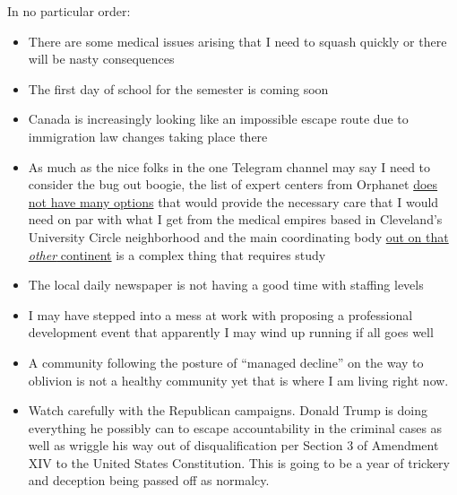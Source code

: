 In no particular order:

\begin{itemize}
\tightlist
\item
  There are some medical issues arising that I need to squash quickly or
  there will be nasty consequences
\item
  The first day of school for the semester is coming soon
\item
  Canada is increasingly looking like an impossible escape route due to
  immigration law changes taking place there
\item
  As much as the nice folks in the one Telegram channel may say I need
  to consider the bug out boogie, the list of expert centers from
  Orphanet
  \href{https://www.orpha.net/consor/cgi-bin/Clinics_Search.php?Clinics_Clinics_Search_ActivitiesList_Sort=null&lng=EN&type_list=clinics_search_simple_shd&data_id=21218&Disease\%28s\%29\%2Fgroup_of_diseases=PTEN-hamartoma-tumor-syndrome&title=PTEN+hamartoma+tumor+syndrome&search=Clinics_Search_Simple&ChdId=21218&Clinics_Clinics_Search_diseaseGroup=PTEN-hamartoma-tumor-syndrome&Clinics_Clinics_Search_diseaseType=Pat&Clinics_Clinics_Search_CnsType=n&Clinics_Clinics_Search_age=Adult&Clinics_Clinics_Search_country=NN&Clinics_Clinics_Search_referenceCenter=on&Clinics_Clinics_Search_GeographicType=null}{does
  not have many options} that would provide the necessary care that I
  would need on par with what I get from the medical empires based in
  Cleveland's University Circle neighborhood and the main coordinating
  body \href{https://rarevoices.org.au}{out on that \emph{other}
  continent} is a complex thing that requires study
\item
  The local daily newspaper is not having a good time with staffing
  levels
\item
  I may have stepped into a mess at work with proposing a professional
  development event that apparently I may wind up running if all goes
  well
\item
  A community following the posture of ``managed decline'' on the way to
  oblivion is not a healthy community yet that is where I am living
  right now.
\item
  Watch carefully with the Republican campaigns. Donald Trump is doing
  everything he possibly can to escape accountability in the criminal
  cases as well as wriggle his way out of disqualification per Section 3
  of Amendment XIV to the United States Constitution. This is going to
  be a year of trickery and deception being passed off as normalcy.
\end{itemize}
